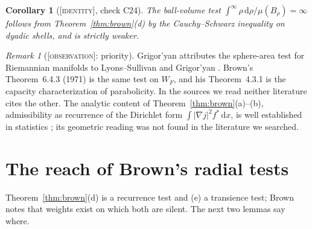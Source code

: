 \documentclass[a4paper,11pt,noarxiv]{quantumarticle}
\newcommand{\abs}[1]{\lvert #1\rvert}
\newcommand{\dd}{\,\mathrm{d}}
\newcommand{\grad}{\nabla}
\newcommand{\status}[1]{\textsc{\small [#1]}}
\theoremstyle{plain}
\newtheorem{corollary}[proposition]{Corollary}
\theoremstyle{definition}
\theoremstyle{remark}
\newtheorem{remark}[proposition]{Remark}
\begin{document}
\begin{corollary}[\status{identity}, check C24]
The ball-volume test $\int^\infty\rho\dd\rho/\mu(B_\rho)=\infty$
\cite[Thm.\ 7.3]{grigoryan1999} follows from Theorem~\ref{thm:brown}(d)
by the Cauchy--Schwarz inequality on dyadic shells, and is strictly
weaker.
\end{corollary}

\begin{remark}[\status{observation}: priority]\label{rem:k7}
Grigor'yan \cite[p.~178]{grigoryan1999} attributes the sphere-area test
for Riemannian manifolds to Lyons--Sullivan \cite{lyonssullivan1984}
and Grigor'yan \cite{grigoryan1985}. Brown's Theorem~6.4.3 (1971) is
the same test on $W_F$, and his Theorem~4.3.1 is the capacity
characterization of parabolicity. In the sources we read neither
literature cites the other. The analytic content of
Theorem~\ref{thm:brown}(a)--(b), admissibility as recurrence of the
Dirichlet form $\int\abs{\grad j}^2f^*\dd x$, is well established in
statistics \cite{brown1971,johnstone1986,eaton1992,takanashi2023};
its geometric reading was not found in the literature we searched.
\end{remark}

\section{The reach of Brown's radial tests}\label{sec:reach}

Theorem~\ref{thm:brown}(d) is a recurrence test and (e) a transience
test; Brown notes \cite[p.~900]{brown1971} that weights exist on which
both are silent. The next two lemmas say where.
\end{document}
